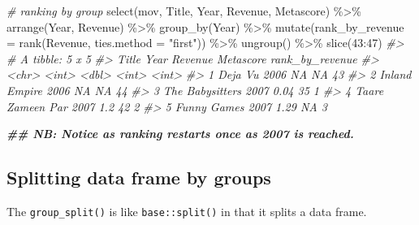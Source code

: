 \documentclass[
]{book}
\newenvironment{Shaded}{\begin{snugshade}}{\end{snugshade}}
\newcommand{\AttributeTok}[1]{\textcolor[rgb]{0.77,0.63,0.00}{#1}}
\newcommand{\CommentTok}[1]{\textcolor[rgb]{0.56,0.35,0.01}{\textit{#1}}}
\newcommand{\DecValTok}[1]{\textcolor[rgb]{0.00,0.00,0.81}{#1}}
\newcommand{\DocumentationTok}[1]{\textcolor[rgb]{0.56,0.35,0.01}{\textbf{\textit{#1}}}}
\newcommand{\FunctionTok}[1]{\textcolor[rgb]{0.00,0.00,0.00}{#1}}
\newcommand{\NormalTok}[1]{#1}
\newcommand{\SpecialCharTok}[1]{\textcolor[rgb]{0.00,0.00,0.00}{#1}}
\newcommand{\StringTok}[1]{\textcolor[rgb]{0.31,0.60,0.02}{#1}}
\begin{document}
\begin{Shaded}
\begin{Highlighting}[]
\CommentTok{\# ranking by group}
\FunctionTok{select}\NormalTok{(mov, Title, Year, Revenue, Metascore) }\SpecialCharTok{\%\textgreater{}\%}
  \FunctionTok{arrange}\NormalTok{(Year, Revenue) }\SpecialCharTok{\%\textgreater{}\%}
  \FunctionTok{group\_by}\NormalTok{(Year) }\SpecialCharTok{\%\textgreater{}\%}
  \FunctionTok{mutate}\NormalTok{(}\AttributeTok{rank\_by\_revenue =} \FunctionTok{rank}\NormalTok{(Revenue, }\AttributeTok{ties.method =} \StringTok{"first"}\NormalTok{)) }\SpecialCharTok{\%\textgreater{}\%}
  \FunctionTok{ungroup}\NormalTok{() }\SpecialCharTok{\%\textgreater{}\%}
  \FunctionTok{slice}\NormalTok{(}\DecValTok{43}\SpecialCharTok{:}\DecValTok{47}\NormalTok{)}
\CommentTok{\#\textgreater{} \# A tibble: 5 x 5}
\CommentTok{\#\textgreater{}   Title             Year Revenue Metascore rank\_by\_revenue}
\CommentTok{\#\textgreater{}   \textless{}chr\textgreater{}            \textless{}int\textgreater{}   \textless{}dbl\textgreater{}     \textless{}int\textgreater{}           \textless{}int\textgreater{}}
\CommentTok{\#\textgreater{} 1 Deja Vu           2006   NA           NA              43}
\CommentTok{\#\textgreater{} 2 Inland Empire     2006   NA           NA              44}
\CommentTok{\#\textgreater{} 3 The Babysitters   2007    0.04        35               1}
\CommentTok{\#\textgreater{} 4 Taare Zameen Par  2007    1.2         42               2}
\CommentTok{\#\textgreater{} 5 Funny Games       2007    1.29        NA               3}

\DocumentationTok{\#\# NB: Notice as ranking restarts once as 2007 is reached.}
\end{Highlighting}
\end{Shaded}

\hypertarget{splitting-data-frame-by-groups}{%
\subsection{Splitting data frame by groups}\label{splitting-data-frame-by-groups}}

The \texttt{group\_split()} is like \texttt{base::split()} in that it splits a data frame.
\end{document}
